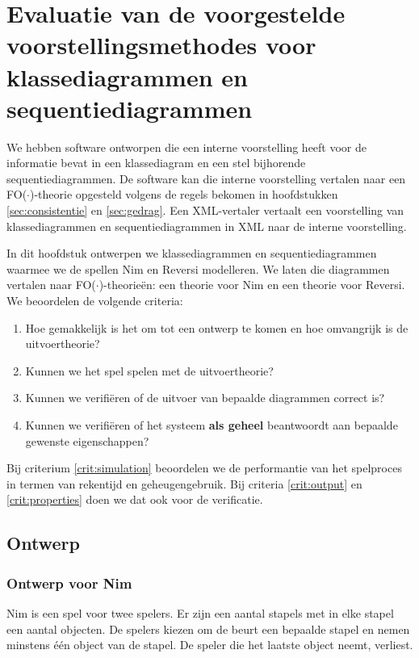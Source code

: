 \chapter{Evaluatie van de voorgestelde voorstellingsmethodes voor klassediagrammen en sequentiediagrammen}\label{sec:evaluatie}
We hebben software ontworpen die een interne voorstelling heeft voor de informatie bevat in een klassediagram en een stel bijhorende sequentiediagrammen. De software kan die interne voorstelling vertalen naar een FO($\cdot$)-theorie opgesteld volgens de regels bekomen in hoofdstukken \ref{sec:consistentie} en \ref{sec:gedrag}. Een XML-vertaler vertaalt een voorstelling van klassediagrammen en sequentiediagrammen in XML naar de interne voorstelling.

In dit hoofdstuk ontwerpen we klassediagrammen en sequentiediagrammen waarmee we de spellen Nim en Reversi modelleren. We laten die diagrammen vertalen naar FO($\cdot$)-theorie\"en: een theorie voor Nim en een theorie voor Reversi. We beoordelen de volgende criteria:

\begin{enumerate}
	\item Hoe gemakkelijk is het om tot een ontwerp te komen en hoe omvangrijk is de uitvoertheorie?\label{crit:design}
	\item Kunnen we het spel spelen met de uitvoertheorie?\label{crit:simulation}
	\item Kunnen we verifi\"eren of de uitvoer van bepaalde diagrammen correct is?\label{crit:output}
	\item Kunnen we verifi\"eren of het systeem \textbf{als geheel} beantwoordt aan bepaalde gewenste eigenschappen?\label{crit:properties}
\end{enumerate}

Bij criterium \ref{crit:simulation} beoordelen we de performantie van het spelproces in termen van rekentijd en geheugengebruik. Bij criteria \ref{crit:output} en \ref{crit:properties} doen we dat ook voor de verificatie.

\section{Ontwerp}\label{sec:eval-design}

\subsection{Ontwerp voor Nim}\label{sec:nim-design}

Nim is een spel voor twee spelers. Er zijn een aantal stapels met in elke stapel een aantal objecten. De spelers kiezen om de beurt een bepaalde stapel en nemen minstens \'e\'en object van de stapel. De speler die het laatste object neemt, verliest.

